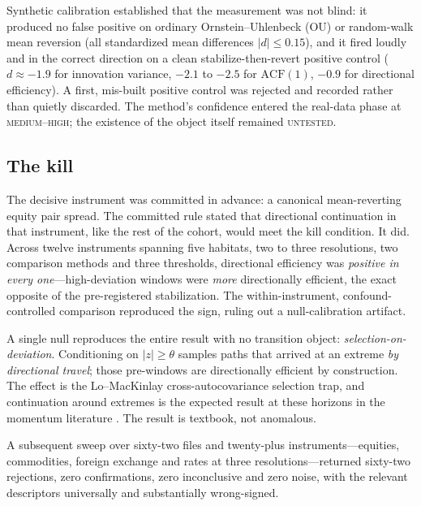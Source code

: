 \documentclass[11pt,a4paper]{article}
\begin{document}
Synthetic calibration established that the measurement was not blind: it produced no false positive on
ordinary Ornstein--Uhlenbeck (OU) or random-walk mean reversion (all standardized mean differences
$|d|\leq 0.15$), and it fired loudly and in the correct direction on a clean stabilize-then-revert
positive control ($d\approx -1.9$ for innovation variance, $-2.1$ to $-2.5$ for $\mathrm{ACF}(1)$,
$-0.9$ for directional efficiency). A first, mis-built positive control was rejected and recorded
rather than quietly discarded. The method's confidence entered the real-data phase at
\textsc{medium--high}; the existence of the object itself remained \textsc{untested}.

\subsection{The kill}

The decisive instrument was committed in advance: a canonical mean-reverting equity pair spread. The
committed rule stated that directional continuation in that instrument, like the rest of the cohort,
would meet the kill condition. It did. Across twelve instruments spanning five habitats, two to three
resolutions, two comparison methods and three thresholds, directional efficiency was \emph{positive in
every one}---high-deviation windows were \emph{more} directionally efficient, the exact opposite of the
pre-registered stabilization. The within-instrument, confound-controlled comparison reproduced the
sign, ruling out a null-calibration artifact.

A single null reproduces the entire result with no transition object: \emph{selection-on-deviation}.
Conditioning on $|z|\geq\theta$ samples paths that arrived at an extreme \emph{by directional travel};
those pre-windows are directionally efficient by construction. The effect is the Lo--MacKinlay
\cite{LoMacKinlay1990} cross-autocovariance selection trap, and continuation around extremes is the
expected result at these horizons in the momentum literature \cite{GeorgeHwang2004,JT1993}. The
result is textbook, not anomalous.

A subsequent sweep over sixty-two files and twenty-plus instruments---equities, commodities, foreign
exchange and rates at three resolutions---returned sixty-two rejections, zero confirmations, zero
inconclusive and zero noise, with the relevant descriptors universally and substantially wrong-signed.
\end{document}

